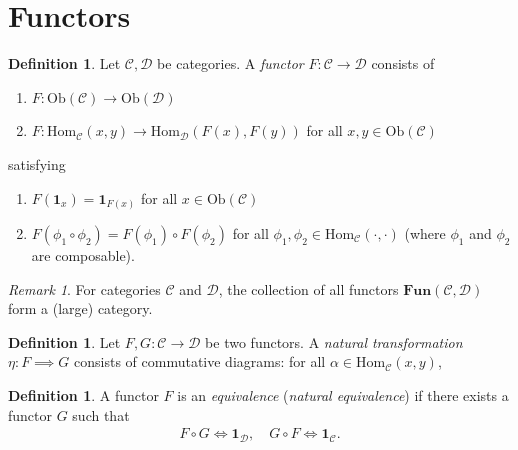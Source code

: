 \documentclass[12pt]{report}
\theoremstyle{plain}
\theoremstyle{remark}
\newtheorem*{remark}{Remark}
\theoremstyle{definition}
\newtheorem{definition}[theorem]{Definition}
\begin{document}
\section{Functors}
\begin{definition}
    Let $\mathcal{C},\mathcal{D}$ be categories. A \emph{functor} $F:\mathcal{C}\rightarrow\mathcal{D}$ consists of
    \begin{enumerate}
        \item $F:\mathrm{Ob}(\mathcal{C})\rightarrow \mathrm{Ob}(\mathcal{D})$
        \item $F:\mathrm{Hom}_\mathcal{C}(x,y)\rightarrow \mathrm{Hom}_\mathcal{D}(F(x),F(y))$ for all $x,y\in \mathrm{Ob}(\mathcal{C})$
    \end{enumerate}
    satisfying
    \begin{enumerate}
        \item $F(\mathbf{1}_x)=\mathbf{1}_{F(x)}$ for all $x\in \mathrm{Ob}(\mathcal{C})$
        \item $F(\phi_1\circ\phi_2) = F(\phi_1)\circ F(\phi_2)$ for all $\phi_1,\phi_2\in\mathrm{Hom}_\mathcal{C}(\cdot,\cdot)$ (where $\phi_1$ and $\phi_2$ are composable).
    \end{enumerate}
\end{definition}
\begin{remark}
    For categories $\mathcal{C}$ and $\mathcal{D}$, the collection of all functors $\mathbf{Fun}(\mathcal{C},\mathcal{D})$ form a (large) category.
\end{remark}

\begin{definition}
    Let $F,G:\mathcal{C}\rightarrow\mathcal{D}$ be two functors. A \emph{natural transformation} $\eta:F\implies G$ consists of commutative diagrams: for all $\alpha\in\mathrm{Hom}_\mathcal{C}(x,y)$,
    \begin{figure}[H]
    \centering
    \end{figure}
\end{definition}

\begin{definition}
    A functor $F$ is an \emph{equivalence} (\emph{natural equivalence}) if there exists a functor $G$ such that
    \begin{align*}
        F\circ G \iff \mathbf{1}_\mathcal{D},\quad G\circ F \iff \mathbf{1}_\mathcal{C}.
    \end{align*}
\end{definition}
\end{document}
